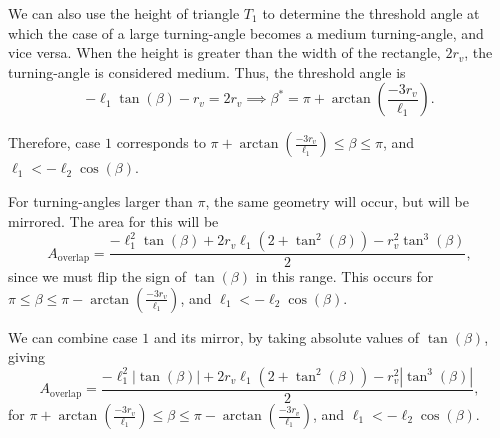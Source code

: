 We can also use the height of triangle $T_1$ to determine the threshold angle at which the case of a large turning-angle becomes a medium turning-angle, and vice versa. When the height is greater than the width of the rectangle, $2r_v$, the turning-angle is considered medium. Thus, the threshold angle is
\[-\ell_1 \tan(\beta)-r_v = 2r_v \implies \beta^* = \pi+\arctan\left(\frac{-3r_v}{\ell_1}\right). \]

Therefore, case $1$ corresponds to $\pi+\arctan\left(\frac{-3r_v}{\ell_1}\right) \leq \beta \leq \pi$, and $\ell_1 < -  \ell_2 \cos (\beta)$.

For turning-angles larger than $\pi$, the same geometry will occur, but will be mirrored. The area for this will be
\[  A_{\text{overlap}} = \frac{-\ell_1^2 \tan(\beta) + 2r_v \ell_1(2+\tan^2(\beta))  - r_v^2 \tan^3(\beta)}{2},\]
since we must flip the sign of $\tan(\beta)$ in this range. This occurs for $\pi \leq \beta \leq \pi-\arctan\left(\frac{-3r_v}{\ell_1}\right)$, and $\ell_1 <-  \ell_2 \cos (\beta)$.

We can combine case $1$ and its mirror, by taking absolute values of $\tan(\beta)$, giving
\[  A_{\text{overlap}} = \frac{-\ell_1^2 \left|\tan(\beta)\right| + 2r_v \ell_1(2+\tan^2(\beta))  - r_v^2 \left|\tan^3(\beta)\right|}{2},\]
for $\pi+\arctan\left(\frac{-3r_v}{\ell_1}\right) \leq \beta \leq \pi-\arctan\left(\frac{-3r_v}{\ell_1}\right)$, and $\ell_1 < -  \ell_2 \cos (\beta)$.
\FloatBarrier
